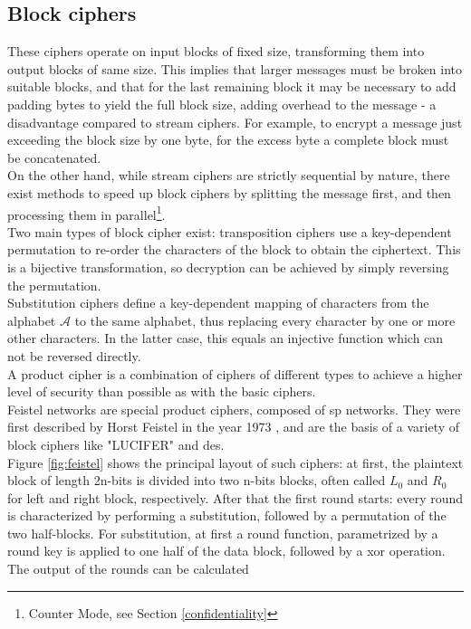 \subsection{Block ciphers}
These ciphers operate on input blocks of fixed size, transforming them into output blocks of same size. This implies that larger messages must be broken into
suitable blocks, and that for the last remaining block it may be necessary to add padding bytes to yield the full block size,
adding overhead to the message - a disadvantage compared to stream ciphers. For example, to encrypt a message just exceeding the block size by one byte,
for the excess byte a complete block must be concatenated. 
\\
On the other hand, while stream ciphers are strictly sequential by nature, there exist methods to speed up block ciphers by splitting the message
first, and then processing them in parallel\footnote{Counter Mode, see Section \ref{confidentiality}}. 
\\
Two main types of block cipher exist: transposition ciphers use a key-dependent permutation to re-order the characters of the block to obtain the ciphertext.
This is a bijective transformation, so decryption can be achieved by simply reversing the permutation.
\\
Substitution ciphers define a key-dependent mapping of characters from the alphabet $\mathcal{A}$ to the same alphabet, thus replacing every character by one
or more other characters. In the latter case, this equals an injective function which can not be reversed directly.
\\
A product cipher is a combination of ciphers of different types to achieve a higher level of security than possible as with the basic ciphers. 
\\
Feistel networks are special product ciphers, composed of \gls{sp} networks. They were first described by Horst Feistel in the year 1973 \cite{feistel}, and are 
the basis of a variety of block ciphers like "LUCIFER" \cite{feistel1974block,} and \gls{des}.
\\
Figure \ref{fig:feistel} shows the principal layout of such ciphers: at first, the plaintext block of length
2n-bits is divided into two n-bits blocks, often called $L_0$ and $R_0$ for left and right block, respectively. After that the first round starts: every round
is characterized by performing a substitution, followed by a permutation of the two half-blocks. For substitution, at first a round function,
parametrized by a round key is applied to one half of the data block, followed by a \gls{xor} operation. The output of the rounds can be calculated
